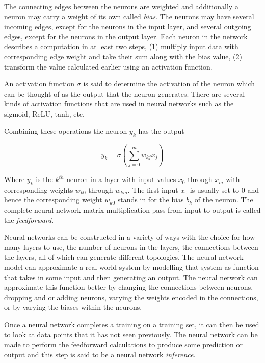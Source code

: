 The connecting edges between the neurons are weighted and additionally a neuron may carry a weight of its own called \textit{bias}. The neurons may have several incoming edges, except for the neurons in the input layer, and several outgoing edges, except for the neurons in the output layer. Each neuron in the network describes a computation in at least two steps, (1) multiply input data with corresponding edge weight and take their sum along with the bias value, (2) transform the value calculated earlier using an activation function.

An activation function $\sigma$ is said to determine the activation of the neuron which can be thought of as the output that the neuron generates. There are several kinds of activation functions that are used in neural networks such as the sigmoid, ReLU, tanh, etc.

Combining these operations the neuron $y_k$ has the output

\begin{equation}
	y_k = \sigma \left( \sum_{j=0}^m w_{kj} x_j \right)
\end{equation}

Where $y_k$ is the $k^{th}$ neuron in a layer with input values $x_0$ through $x_m$ with corresponding weights $w_{k0}$ through $w_{km}$. The first input $x_0$ is usually set to $0$ and hence the corresponding weight $w_{k0}$ stands in for the bias $b_k$ of the neuron. The complete neural network matrix multiplication pass from input to output is called the \textit{feedforward}.

Neural networks can be constructed in a variety of ways with the choice for how many layers to use, the number of neurons in the layers, the connections between the layers, all of which can generate different topologies. The neural network model can approximate a real world system by modelling that system as function that takes in some input and then generating an output. The neural network can approximate this function better by changing the connections between neurons, dropping and or adding neurons, varying the weights encoded in the connections, or by varying the biases within the neurons.

Once a neural network completes a training on a training set, it can then be used to look at data points that it has not seen previously. The neural network can be made to perform the feedforward calculations to produce some prediction or output and this step is said to be a neural network \textit{inference}.

